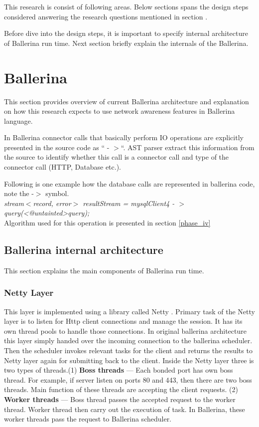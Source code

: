 This research is consist of following areas. Below sections spans the design steps considered answering the research questions mentioned in section .

Before dive into the design steps, it is important to specify internal architecture of Ballerina run time. Next section briefly explain the internals of the Ballerina.

\section{Ballerina}\label{Sec_Ballerina}

This section provides overview of current Ballerina architecture and explanation on how this research expects to use network awareness features in Ballerina language.  

In Ballerina connector calls that basically perform IO operations are explicitly presented in the source code as “ - $>$“. \acrfull{AST} parser extract this information from the source to identify whether this call is a connector call and type of the connector call (HTTP, Database etc.).

Following is one example how the database calls are represented in ballerina code, note the -$>$ symbol.\\

\textit{stream$<$record{}, error$>$ resultStream = mysqlClient4 - $>$ query(<@untainted>query);}\\

Algorithm used for this operation is presented in section \ref{phase_iv}

\subsection{Ballerina internal architecture}

This section explains the main components of Ballerina run time.

\subsubsection{Netty Layer}

This layer is implemented using a library called Netty \cite{netty}. Primary task of the Netty layer is to listen for Http client connections and manage the session. It has its own thread pools to handle those connections. In original ballerina architecture this layer simply handed over the incoming connection to the ballerina scheduler. Then the scheduler invokes relevant tasks for the client and returns the results to Netty layer again for submitting back to the client. Inside the Netty layer three is two types of threads.(1) \textbf{Boss threads} — Each bonded port has own boss thread. For example, if server listen on ports 80 and 443, then there are two boss threads. Main function of these threads are accepting the client requests. (2) \textbf{Worker threads} — Boss thread passes the accepted request to the worker thread. Worker thread then carry out the execution of task. In Ballerina, these worker threads pass the request to Ballerina scheduler.

